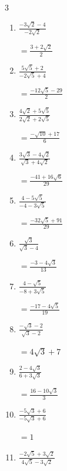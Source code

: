 \begin{multicols}{3}
\begin{enumerate}
        $\displaystyle =\frac{85-13\sqrt{5}}{116}$

  \item $\displaystyle \frac{-3\sqrt{2}-4}{-2\sqrt{2}}$

        $\displaystyle =\frac{3+2\sqrt{2}}{2}$

  \item $\displaystyle \frac{5\sqrt{5}+2}{-2\sqrt{5}+4}$

        $\displaystyle =\frac{-12\sqrt{5}-29}{2}$

  \item $\displaystyle \frac{4\sqrt{2}+5\sqrt{5}}{2\sqrt{2}+2\sqrt{5}}$

        $\displaystyle =\frac{-\sqrt{10}+17}{6}$

\columnbreak %

  \item $\displaystyle \frac{3\sqrt{3}-4\sqrt{2}}{\sqrt{3}+4\sqrt{2}}$

        $\displaystyle =\frac{-41+16\sqrt{6}}{29}$

  \item $\displaystyle \frac{4-5\sqrt{5}}{-4-3\sqrt{5}}$

        $\displaystyle =\frac{-32\sqrt{5}+91}{29}$

  \item $\displaystyle \frac{\sqrt{3}}{\sqrt{3}-4}$

        $\displaystyle =\frac{-3-4\sqrt{3}}{13}$

  \item $\displaystyle \frac{4-\sqrt{5}}{-8+3\sqrt{5}}$

        $\displaystyle =\frac{-17-4\sqrt{5}}{19}$

  \item $\displaystyle \frac{-\sqrt{3}-2}{\sqrt{3}-2}$

        $\displaystyle =4\sqrt{3}+7$

\columnbreak %

  \item $\displaystyle \frac{2-4\sqrt{3}}{6+3\sqrt{3}}$

        $\displaystyle =\frac{16-10\sqrt{3}}{3}$

  \item $\displaystyle \frac{-5\sqrt{3}+6}{-5\sqrt{3}+6}$

        $\displaystyle =1$

  \item $\displaystyle \frac{-2\sqrt{5}+3\sqrt{2}}{4\sqrt{5}-3\sqrt{2}}$


\end{enumerate}
\end{multicols}
